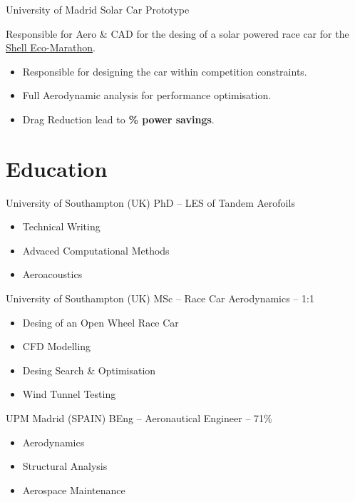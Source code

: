 \documentclass[fontsize=10pt]{tccv}
\begin{document}
\begin{eventlist}
     {University of Madrid}
     {Solar Car Prototype}

Responsible for Aero \& CAD for the desing of a solar powered race car for the \href{http://www.shell.com/global/environment-society/ecomarathon.html}{Shell Eco-Marathon}.
\begin{itemize}
\itemsep -1pt
	\item Responsible for designing the car within competition constraints.
        \item Full Aerodynamic analysis for performance optimisation.
	\item Drag Reduction lead to \textbf{\% power savings}.
\end{itemize}
\end{eventlist}


\section{Education}

\begin{eventlist}

     	{University of Southampton (UK)}
     	{PhD -- LES of Tandem Aerofoils} 
	\begin{itemize}
	\itemsep -1pt
		\item Technical Writing
		\item Advaced Computational Methods
		\item Aeroacoustics
	\end{itemize}

     	{University of Southampton (UK)}
     	{MSc -- Race Car Aerodynamics -- 1:1} 
  	\begin{itemize}
	\itemsep -1pt
	   \item Desing of an Open Wheel Race Car
	   \item CFD Modelling
	   \item Desing Search \& Optimisation
	   \item Wind Tunnel Testing
	\end{itemize}

	{UPM Madrid (SPAIN)}
	{BEng -- Aeronautical Engineer -- 71\%}
  	\begin{itemize}
	\itemsep -1pt
	   \item Aerodynamics
	   \item Structural Analysis
	   \item Aerospace Maintenance
	\end{itemize}
\end{eventlist}
\end{document}
